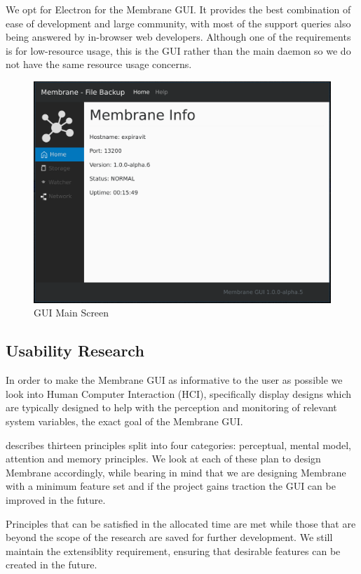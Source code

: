 \documentclass[11pt, a4paper, twocolumn, twoside]{report}
\begin{document}
We opt for Electron for the Membrane GUI. It provides the best combination of ease of development and large community, with most of the support queries also being answered by in-browser web developers. Although one of the requirements is for low-resource usage, this is the GUI rather than the main daemon so we do not have the same resource usage concerns.

\begin{figure}[!ht]
 \centering
 \includegraphics[width=\textwidth]{gui-main}
 \caption{GUI Main Screen}
 \label{fig:gui-main}
\end{figure}

\subsection{Usability Research}

In order to make the Membrane GUI as informative to the user as possible we look into Human Computer Interaction (HCI), specifically display designs which are typically designed to help with the perception and monitoring of relevant system variables, the exact goal of the Membrane GUI.

\cite{wickens1998introduction} describes thirteen principles split into four categories: perceptual, mental model, attention and memory principles. We look at each of these plan to design Membrane accordingly, while bearing in mind that we are designing Membrane with a minimum feature set \citep{blank2010mfs} and if the project gains traction the GUI can be improved in the future.

Principles that can be satisfied in the allocated time are met while those that are beyond the scope of the research are saved for further development. We still maintain the extensiblity requirement, ensuring that desirable features can be created in the future.
\end{document}
